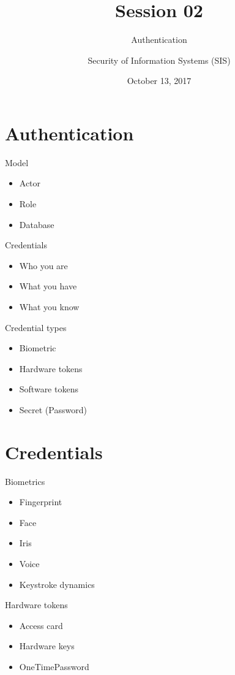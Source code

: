 \documentclass{curs}
\title[Session 02]{Session 02}
\subtitle{Authentication}
\author{Security of Information Systems (SIS)}
\date{October 13, 2017}
\begin{document}
\frame{\titlepage}


\section{Authentication}

\begin{frame}{Model}
  \begin{itemize}
    \item Actor
    \item Role
    \item Database
  \end{itemize}
\end{frame}

\begin{frame}{Credentials}
  \begin{itemize}
    \item Who you are
    \item What you have
    \item What you know
  \end{itemize}
\end{frame}

\begin{frame}{Credential types}
  \begin{itemize}
    \item Biometric
    \item Hardware tokens
    \item Software tokens
    \item Secret (Password)
  \end{itemize}
\end{frame}


\section{Credentials}

\begin{frame}{Biometrics}
  \begin{itemize}
    \item Fingerprint
    \item Face
    \item Iris
    \item Voice
    \item Keystroke dynamics
  \end{itemize}
\end{frame}

\begin{frame}{Hardware tokens}
  \begin{itemize}
      \item Access card
      \item Hardware keys
      \item OneTimePassword
    \end{itemize}
\end{frame}
\end{document}
